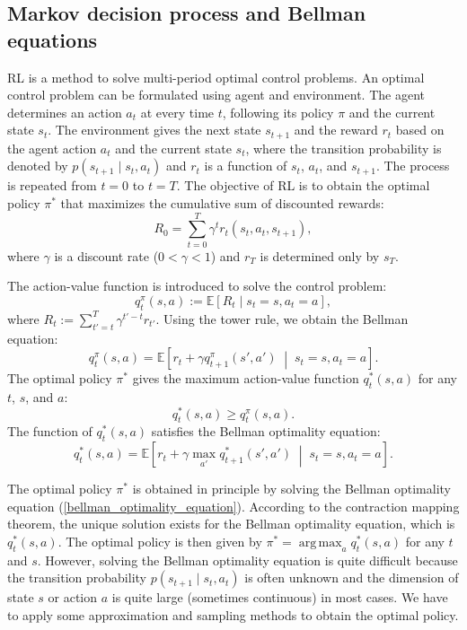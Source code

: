 \documentclass[11pt]{article}
\DeclareMathOperator*{\argmax}{arg\,max}
\begin{document}
\subsection{Markov decision process and Bellman equations}

RL is a method to solve multi-period optimal control problems. An optimal control problem can be formulated using agent and environment. The agent determines an action $a_t$ at every time $t$, following its policy $\pi$ and the current state $s_t$. The environment gives the next state $s_{t+1}$ and the reward $r_t$ based on the agent action $a_t$ and the current state $s_{t}$, where the transition probability is denoted by $p(s_{t+1} \mid s_t, a_t)$ and $r_t$ is a function of $s_t$, $a_t$, and $s_{t+1}$. The process is repeated from $t=0$ to $t=T$. The objective of RL is to obtain the optimal policy $\pi^\ast$ that maximizes the cumulative sum of discounted rewards:
%
\begin{equation}
	R_{0} = \sum_{t=0}^{T} {\gamma}^t r_t(s_t, a_t, s_{t+1}),
\end{equation}
%
where $\gamma$ is a discount rate ($0 < \gamma < 1$) and $r_T$ is determined only by $s_{T}$.

The action-value function is introduced to solve the control problem:
%
\begin{equation}
	q_{t}^{\pi}(s,a) := \mathbb{E}[R_t \mid s_t = s, a_t = a], \label{bellman_equation}
\end{equation}
%
where $R_t := \sum_{t'=t}^{T} {\gamma}^{t'-t} r_{t'}$. Using the tower rule, we obtain the Bellman equation:
%
\begin{equation}
	q_{t}^{\pi}(s,a) = \mathbb{E}\left[  r_{t} + \gamma q_{t+1}^{\pi}(s', a') \;\middle|\; s_t = s, a_t = a\right].
\end{equation}
%
The optimal policy $\pi^\ast$ gives the maximum action-value function $q^{\ast}_t(s,a)$ for any $t$, $s$, and $a$:
%
\begin{equation}
	q^{\ast}_t(s,a) \ge q_{t}^{\pi}(s,a).
\end{equation}
%
The function of $q^{\ast}_t(s,a)$ satisfies the Bellman optimality equation:
%
\begin{equation}
	q^{\ast}_t(s,a) = \mathbb{E}\left[  r_{t} + \gamma \max_{a'} q_{t+1}^{\ast}(s', a') \;\middle|\; s_t = s, a_t = a\right]. \label{bellman_optimality_equation}
\end{equation}

The optimal policy $\pi^\ast$ is obtained in principle by solving the Bellman optimality equation (\ref{bellman_optimality_equation}). According to the contraction mapping theorem, the unique solution exists for the Bellman optimality equation, which is $q^{\ast}_t(s,a)$. The optimal policy is then given by $\pi^\ast = \argmax_{a} q_t^{\ast}(s,a)$ for any $t$ and $s$. However, solving the Bellman optimality equation is quite difficult because the transition probability $p(s_{t+1} \mid s_{t}, a_{t})$ is often unknown and the dimension of state $s$ or action $a$ is quite large (sometimes continuous) in most cases. We have to apply some approximation and sampling methods to obtain the optimal policy.
\end{document}
